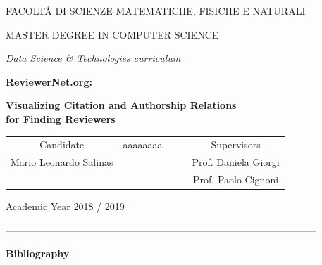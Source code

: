\documentclass[11pt,a4paper,openany,oneside]{book}
\theoremstyle{definition}
\begin{document}
	\begin{Large}
		\begin{center}
			FACOLT\'A DI SCIENZE MATEMATICHE, FISICHE E NATURALI
			\vspace{1.5cm}


			MASTER DEGREE IN COMPUTER SCIENCE
			
			\textit{Data Science \& Technologies curriculum}
			\vspace{2.5cm}


			\textbf{ReviewerNet.org:}


			\textbf{Visualizing Citation and Authorship Relations\\for Finding Reviewers}
			\vspace{1.5cm}
			\begin{table}[h!]
				\centering
				\label{my-label}
				\begin{tabular}{ccccc}
					Candidate              & {\color{white} aaaaaaaa} &  &  & Supervisors                 					\\Mario Leonardo Salinas &                                             &  &  						& Prof. Daniela Giorgi \\
				   &                                             &  &  &  Prof. Paolo Cignoni \\
				                           

				\end{tabular}
			\end{table}
		\end{center}
	\end{Large}
	\vspace{0.5cm}
	\begin{normalsize}
		\begin{center}
			Academic Year 2018 / 2019
		\end{center}
	\end{normalsize}	
\newpage
	\cleardoublepage
	\tableofcontents
	\begin{normalsize}
-----------------------------------------------------------------------------------------------
	\end{normalsize}
	\textbf{Bibliography}
	
\end{document}
